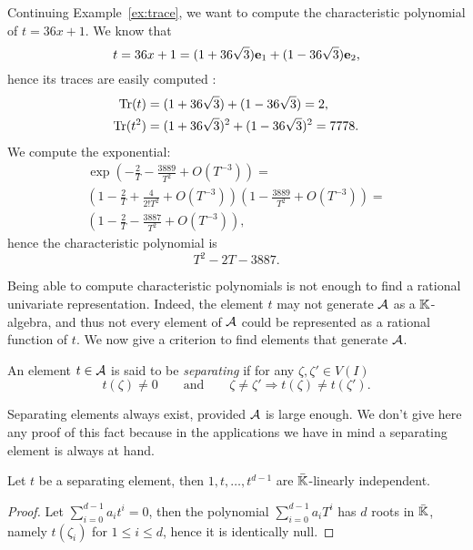 \begin{example}
  Continuing Example~\ref{ex:trace}, we want to compute the characteristic
  polynomial of $t=36x+1$. We know that
  \[t=36x + 1 = (1+36\sqrt{3})\mathbf{e}_1 + (1-36\sqrt{3})\mathbf{e}_2
  \text{,}\]
  hence its traces are easily computed :
  \begin{align*}
    \operatorname{Tr}(t) &= (1 + 36\sqrt{3}) + (1-36\sqrt{3}) = 2\text{,}\\
    \operatorname{Tr}(t^2) &= (1 + 36\sqrt{3})^2 + (1-36\sqrt{3})^2 = 7778\text{.}
  \end{align*}
  We compute the exponential:
  \begin{multline*}
    \exp\left(-\frac{2}{T}-\frac{3889}{T^2} + O(T^{-3})\right)=\\
    \left(1-\frac{2}{T}+\frac{4}{2!T^2}+O(T^{-3})\right)\left(1-\frac{3889}{T^2}+O(T^{-3})\right)=\\
    \left(1 - \frac{2}{T} - \frac{3887}{T^2} + O(T^{-3})\right)
    \text{,}
  \end{multline*}
  hence the characteristic polynomial is
  \[T^2-2T-3887\text{.}\]
\end{example}

Being able to compute characteristic polynomials is not enough to find
a rational univariate representation. Indeed, the element $t$ may not
generate $\mathcal{A}$ as a $\mathbb{K}$-algebra, and thus not every element of
$\mathcal{A}$ could be represented as a rational function of $t$. We now
give a criterion to find elements that generate $\mathcal{A}$.

\begin{definition}
  An element $t\in\mathcal{A}$ is said to be \emph{separating} if for
  any $\zeta,\zeta'\in V(I)$
  \[t(\zeta)\ne0 \qquad\text{and}\qquad \zeta\ne\zeta'\Rightarrow t(\zeta)\ne t(\zeta')\text{.}\]
\end{definition}

Separating elements always exist, provided $\mathcal{A}$ is large
enough. We don't give here any proof of this fact because in the
applications we have in mind a separating element is always at hand.

\begin{proposition}
  Let $t$ be a separating element, then $1,t,\ldots,t^{d-1}$ are
  $\bar{\mathbb{K}}$-linearly independent.
\end{proposition}
\begin{proof}
  Let $\sum_{i=0}^{d-1}a_it^i =0$, then the polynomial
  $\sum_{i=0}^{d-1}a_iT^i$ has $d$ roots in $\bar{\mathbb{K}}$, namely
  $t(\zeta_i)$ for $1\le i \le d$, hence it is identically null.
\end{proof}

